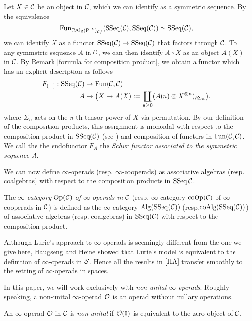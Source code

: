 \begin{remark}
\label{Schur functor}
Let $X \in {\mathcal{C}}$ be an object in ${\mathcal{C}}$, which we can identify as a symmetric sequence.
By the equivalence
$$
\operatorname{Fun}_{\operatorname{CAlg}(\Pr^L)_{{\mathcal{C}}/}}(\operatorname{SSeq}({\mathcal{C}}),\operatorname{SSeq}({\mathcal{C}}))
\simeq
\operatorname{SSeq}({\mathcal{C}}),
$$
we can identify $X$ as a functor $\operatorname{SSeq}({\mathcal{C}}) \to \operatorname{SSeq}({\mathcal{C}})$ that factors through ${\mathcal{C}}$.
To any symmetric sequence $A$ in ${\mathcal{C}}$,  we can then identify $A\circ X$ as an object $A(X)$ in ${\mathcal{C}}$.
By Remark \ref{formula for composition product}, we obtain a functor which has an explicit description as follows
\begin{align*}
		F_{(-)}: \operatorname{SSeq}({\mathcal{C}}) & \rightarrow \operatorname{Fun}({\mathcal{C}},{\mathcal{C}})\\
	A        & \mapsto \big( X\mapsto  A(X):=\coprod_{n\geq 0} (A(n)\otimes X^{\otimes n})_{h\Sigma_n}\big).
\end{align*}
where $\Sigma_n$ acts on the $n$-th tensor power of $X$ via permutation.
By our definition of the composition products, this assignment is monoidal with respect to the composition product in $\operatorname{SSeq}({\mathcal{C}})$ (see \cite[\S 3.1 ]{Francis-Gaitsgory}) and composition of functors in $\operatorname{Fun}({\mathcal{C}},{\mathcal{C}})$.
We call the the endofunctor $F_A$ the \emph{Schur functor associated to the symmetric sequence $A$}.
\end{remark}

We can now define $\infty$-operads (resp. $\infty$-cooperads) as associative algebras (resp. coalgebras) with respect to the composition products in $\operatorname{SSeq}{{\mathcal{C}}}$.
\begin{definition}
	\label{inf operads}
	The \emph{$\infty$-category $\operatorname{Op}({\mathcal{C}})$ of $\infty$-operads in ${\mathcal{C}}$} (resp. $\infty$-category $\operatorname{coOp}({\mathcal{C}})$ of $\infty$-cooperads in ${\mathcal{C}}$) is defined as the $\infty$-category $\operatorname{Alg}(\operatorname{SSeq}({\mathcal{C}}))$ (resp.$\operatorname{coAlg}(\operatorname{SSeq}({\mathcal{C}}))$) of associative algebras (resp. coalgebras) in $\operatorname{SSeq}({\mathcal{C}})$ with respect to the composition product.
\end{definition}


\begin{remark}
Although Lurie's approach to $\infty$-operads \cite[Chapter 2]{HA} is seemingly different from the one we give here,
Haugseng \cite{Haugsengsymseq} and Heine \cite{Hadrianphdthesis} showed that Lurie's model is equivalent to the definition of $\infty$-operads in $\operatorname{\mathcal{S}}$. Hence all the results in $\cite{HA}$ transfer smoothly to the setting of $\infty$-operads in spaces.
\end{remark}

In this paper, we will work exclusively with \emph{non-unital $\infty$-operads}. Roughly speaking, a non-unital $\infty$-operad ${\mathcal{O}}$ is an operad without nullary operations.
\begin{definition}
	\label{non-unital operad}
	An $\infty$-operad ${\mathcal{O}}$ in ${\mathcal{C}}$ is \emph{non-unital} if ${\mathcal{O}}(0)$ is equivalent to the zero object of ${\mathcal{C}}$. 
\end{definition}

